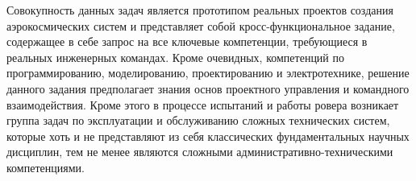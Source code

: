 Совокупность данных задач является прототипом реальных проектов создания аэрокосмических систем и представляет собой кросс-функциональное задание, содержащее в себе запрос на все ключевые компетенции, требующиеся в реальных инженерных командах. Кроме очевидных, компетенций по программированию, моделированию, проектированию и электротехнике, решение данного задания предполагает знания основ проектного управления и командного взаимодействия. Кроме этого в процессе испытаний и работы ровера возникает группа задач по эксплуатации и обслуживанию сложных технических систем, которые хоть и не представляют из себя классических фундаментальных научных дисциплин, тем не менее являются сложными административно-техническими компетенциями.

\clearpage
\endgroup
